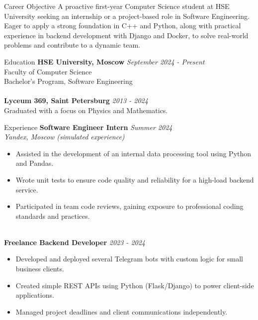 \documentclass{resume} %
\begin{document}
\begin{rSection}{Career Objective}
 A proactive first-year Computer Science student at HSE University seeking an internship or a project-based role in Software Engineering. Eager to apply a strong foundation in C++ and Python, along with practical experience in backend development with Django and Docker, to solve real-world problems and contribute to a dynamic team.
\end{rSection}

\begin{rSection}{Education}
{\bf HSE University, Moscow} \hfill {\em September 2024 - Present} 
\\ Faculty of Computer Science \\ Bachelor's Program, Software Engineering
\\
\\{\bf Lyceum 369, Saint Petersburg} \hfill {\em 2013 - 2024} 
\\ Graduated with a focus on Physics and Mathematics.
\end{rSection}

\begin{rSection}{Experience}
{\bf Software Engineer Intern} \hfill {\em Summer 2024}
\\ {\em Yandex, Moscow (simulated experience)}
\begin{itemize} \itemsep -2pt
    \item Assisted in the development of an internal data processing tool using Python and Pandas.
    \item Wrote unit tests to ensure code quality and reliability for a high-load backend service.
    \item Participated in team code reviews, gaining exposure to professional coding standards and practices.
\end{itemize}
\\
{\bf Freelance Backend Developer} \hfill {\em 2023 - 2024}
\begin{itemize} \itemsep -2pt
    \item Developed and deployed several Telegram bots with custom logic for small business clients.
    \item Created simple REST APIs using Python (Flask/Django) to power client-side applications.
    \item Managed project deadlines and client communications independently.
\end{itemize}
\end{rSection}
\end{document}
